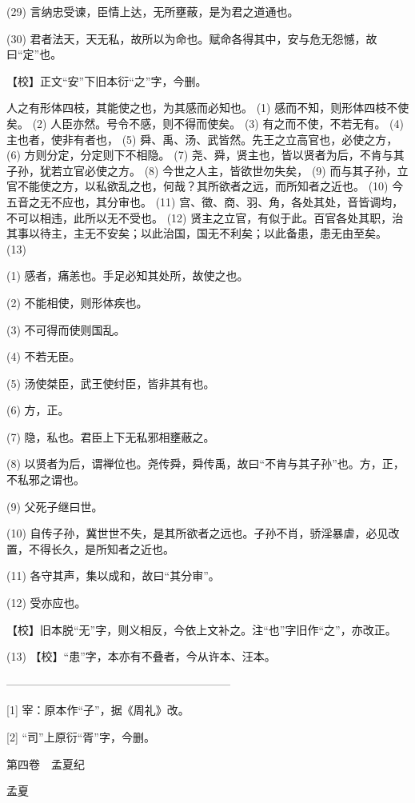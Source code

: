 \documentclass[12pt,UTF8]{ctexbook}
\begin{document}
(29) 言纳忠受谏，臣情上达，无所壅蔽，是为君之道通也。

(30) 君者法天，天无私，故所以为命也。赋命各得其中，安与危无怨憾，故曰“定”也。

【校】正文“安”下旧本衍“之”字，今删。

人之有形体四枝，其能使之也，为其感而必知也。 (1) 感而不知，则形体四枝不使矣。 (2) 人臣亦然。号令不感，则不得而使矣。 (3) 有之而不使，不若无有。 (4) 主也者，使非有者也， (5) 舜、禹、汤、武皆然。先王之立高官也，必使之方， (6) 方则分定，分定则下不相隐。 (7) 尧、舜，贤主也，皆以贤者为后，不肯与其子孙，犹若立官必使之方。 (8) 今世之人主，皆欲世勿失矣， (9) 而与其子孙，立官不能使之方，以私欲乱之也，何哉？其所欲者之远，而所知者之近也。 (10) 今五音之无不应也，其分审也。 (11) 宫、徵、商、羽、角，各处其处，音皆调均，不可以相违，此所以无不受也。 (12) 贤主之立官，有似于此。百官各处其职，治其事以待主，主无不安矣；以此治国，国无不利矣；以此备患，患无由至矣。 (13)

(1) 感者，痛恙也。手足必知其处所，故使之也。

(2) 不能相使，则形体疾也。

(3) 不可得而使则国乱。

(4) 不若无臣。

(5) 汤使桀臣，武王使纣臣，皆非其有也。

(6) 方，正。

(7) 隐，私也。君臣上下无私邪相壅蔽之。

(8) 以贤者为后，谓禅位也。尧传舜，舜传禹，故曰“不肯与其子孙”也。方，正，不私邪之谓也。

(9) 父死子继曰世。

(10) 自传子孙，冀世世不失，是其所欲者之远也。子孙不肖，骄淫暴虐，必见改置，不得长久，是所知者之近也。

(11) 各守其声，集以成和，故曰“其分审”。

(12) 受亦应也。

【校】旧本脱“无”字，则义相反，今依上文补之。注“也”字旧作“之”，亦改正。

(13) 【校】“患”字，本亦有不叠者，今从许本、汪本。




————————————————————

[1] 宰：原本作“子”，据《周礼》改。

[2] “司”上原衍“胥”字，今删。





第四卷　孟夏纪



孟夏
\end{document}
